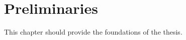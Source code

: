 
\chapter{Preliminaries}
\label{ch:preliminaries}

This chapter should provide the foundations of the thesis.